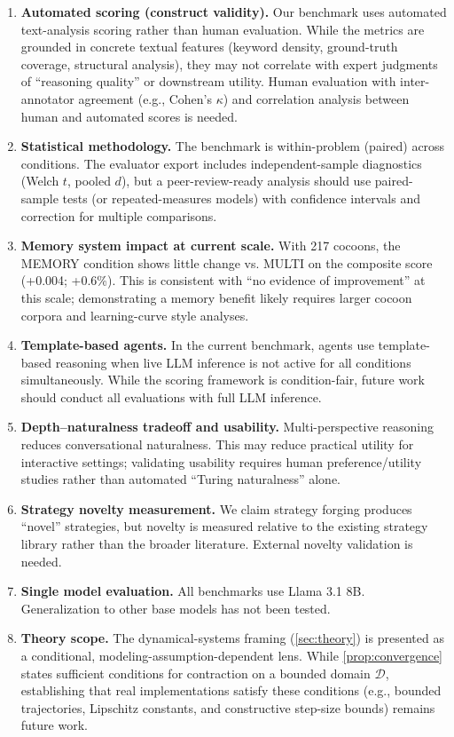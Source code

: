 \documentclass[11pt,a4paper]{article}
\begin{document}
\begin{enumerate}[leftmargin=*]
  \item \textbf{Automated scoring (construct validity).} Our benchmark uses automated text-analysis scoring rather than human evaluation. While the metrics are grounded in concrete textual features (keyword density, ground-truth coverage, structural analysis), they may not correlate with expert judgments of ``reasoning quality'' or downstream utility. Human evaluation with inter-annotator agreement (e.g., Cohen's $\kappa$) and correlation analysis between human and automated scores is needed.
  \item \textbf{Statistical methodology.} The benchmark is within-problem (paired) across conditions. The evaluator export includes independent-sample diagnostics (Welch $t$, pooled $d$), but a peer-review-ready analysis should use paired-sample tests (or repeated-measures models) with confidence intervals and correction for multiple comparisons.
  \item \textbf{Memory system impact at current scale.} With 217 cocoons, the MEMORY condition shows little change vs. MULTI on the composite score (+0.004; +0.6\%). This is consistent with ``no evidence of improvement'' at this scale; demonstrating a memory benefit likely requires larger cocoon corpora and learning-curve style analyses.
  \item \textbf{Template-based agents.} In the current benchmark, agents use template-based reasoning when live LLM inference is not active for all conditions simultaneously. While the scoring framework is condition-fair, future work should conduct all evaluations with full LLM inference.
  \item \textbf{Depth--naturalness tradeoff and usability.} Multi-perspective reasoning reduces conversational naturalness. This may reduce practical utility for interactive settings; validating usability requires human preference/utility studies rather than automated ``Turing naturalness'' alone.
  \item \textbf{Strategy novelty measurement.} We claim strategy forging produces ``novel'' strategies, but novelty is measured relative to the existing strategy library rather than the broader literature. External novelty validation is needed.
  \item \textbf{Single model evaluation.} All benchmarks use Llama 3.1 8B. Generalization to other base models has not been tested.
  \item \textbf{Theory scope.} The dynamical-systems framing (\cref{sec:theory}) is presented as a conditional, modeling-assumption-dependent lens. While \cref{prop:convergence} states sufficient conditions for contraction on a bounded domain $\mathcal{D}$, establishing that real implementations satisfy these conditions (e.g., bounded trajectories, Lipschitz constants, and constructive step-size bounds) remains future work.
\end{enumerate}
\end{document}
